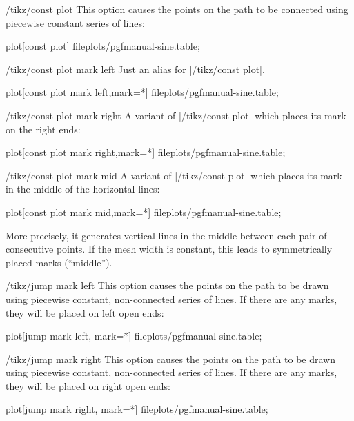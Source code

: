 \begin{key}{/tikz/const plot}
    This option causes the points on the path to be connected using piecewise
    constant series of lines:
\begin{codeexample}[]
\tikz\draw plot[const plot] file{plots/pgfmanual-sine.table};
\end{codeexample}
\end{key}

\begin{key}{/tikz/const plot mark left}
    Just an alias for |/tikz/const plot|.
\begin{codeexample}[]
\tikz\draw plot[const plot mark left,mark=*] file{plots/pgfmanual-sine.table};
\end{codeexample}
\end{key}

\begin{key}{/tikz/const plot mark right}
    A variant of |/tikz/const plot| which places its mark on the right ends:
\begin{codeexample}[]
\tikz\draw plot[const plot mark right,mark=*] file{plots/pgfmanual-sine.table};
\end{codeexample}
\end{key}

\begin{key}{/tikz/const plot mark mid}
    A variant of |/tikz/const plot| which places its mark in the middle of the
    horizontal lines:
\begin{codeexample}[]
\tikz\draw plot[const plot mark mid,mark=*] file{plots/pgfmanual-sine.table};
\end{codeexample}
    More precisely, it generates vertical lines in the middle between each pair
    of consecutive points. If the mesh width is constant, this leads to
    symmetrically placed marks (``middle'').
\end{key}

\begin{key}{/tikz/jump mark left}
    This option causes the points on the path to be drawn using piecewise
    constant, non-connected series of lines. If there are any marks, they will
    be placed on left open ends:
\begin{codeexample}[]
\tikz\draw plot[jump mark left, mark=*] file{plots/pgfmanual-sine.table};
\end{codeexample}
\end{key}

\begin{key}{/tikz/jump mark right}
    This option causes the points on the path to be drawn using piecewise
    constant, non-connected series of lines. If there are any marks, they will
    be placed on right open ends:
\begin{codeexample}[]
\tikz\draw plot[jump mark right, mark=*] file{plots/pgfmanual-sine.table};
\end{codeexample}
\end{key}

